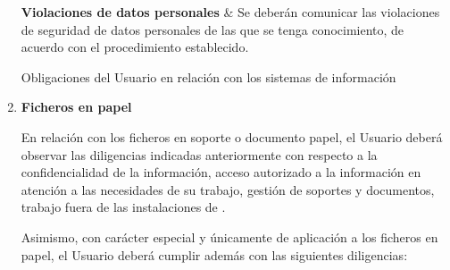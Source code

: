 \begin{enumerate}[label=\alph*)]
\begin{table}[H]
{            \textbf{Violaciones de datos personales} & Se deberán comunicar las violaciones de seguridad de datos personales de las que se tenga conocimiento, de acuerdo con el procedimiento establecido. \\ \hline
        }
        \caption{Obligaciones del Usuario en relación con los sistemas de información}
        \label{tab:guia-sgsi-obligaciones-usuario-sistemas}
        \normalsize
    \end{table}

    \item \textbf{Ficheros en papel}

    En relación con los ficheros en soporte o documento papel, el Usuario deberá observar las diligencias indicadas anteriormente con respecto a la confidencialidad de la información, acceso autorizado a la información en atención a las necesidades de su trabajo, gestión de soportes y documentos, trabajo fuera de las instalaciones de \Beneficiario{}.

    Asimismo, con carácter especial y únicamente de aplicación a los ficheros en papel, el Usuario deberá cumplir además con las siguientes diligencias:


\end{enumerate}
